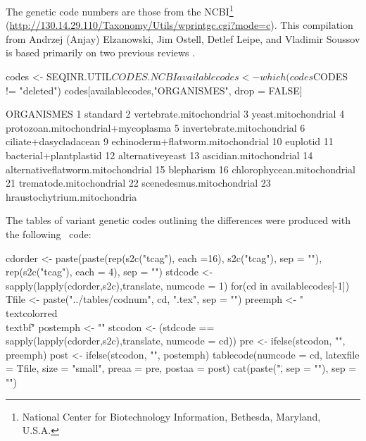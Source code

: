 \documentclass{article}
\begin{document}
The genetic code numbers are those from the NCBI\footnote{
National Center for Biotechnology Information, Bethesda, Maryland, U.S.A.
} (\url{http://130.14.29.110/Taxonomy/Utils/wprintgc.cgi?mode=c}).
This compilation from Andrzej (Anjay) Elzanowski, Jim Ostell, Detlef Leipe, 
and Vladimir Soussov is based primarily on two previous reviews
\cite{OsawaS1992, JukesTH1993}.

\begin{Schunk}
\begin{Sinput}
 codes <- SEQINR.UTIL$CODES.NCBI
 availablecodes <- which(codes$CODES != "deleted")
 codes[availablecodes,"ORGANISMES", drop = FALSE]
\end{Sinput}
\begin{Soutput}
                           ORGANISMES
1                            standard
2            vertebrate.mitochondrial
3                 yeast.mitochondrial
4  protozoan.mitochondrial+mycoplasma
5          invertebrate.mitochondrial
6               ciliate+dasycladacean
9   echinoderm+flatworm.mitochondrial
10                           euplotid
11             bacterial+plantplastid
12                   alternativeyeast
13             ascidian.mitochondrial
14  alternativeflatworm.mitochondrial
15                         blepharism
16        chlorophycean.mitochondrial
21            trematode.mitochondrial
22          scenedesmus.mitochondrial
23       hraustochytrium.mitochondria
\end{Soutput}
\end{Schunk}

The tables of variant genetic codes outlining the differences were produced with the
following \Rlogo{}~code:

\begin{Schunk}
\begin{Sinput}
 cdorder <- paste(paste(rep(s2c("tcag"), each =16), s2c("tcag"), sep = ""), rep(s2c("tcag"), each = 4), sep = "")
 stdcode <- sapply(lapply(cdorder,s2c),translate, numcode = 1)
 for(cd in availablecodes[-1]){
   Tfile <- paste("../tables/codnum", cd, ".tex", sep = "")
   preemph <- "\\textcolor{red}{\\textbf{"
   postemph <- "}}"
   stcodon <- (stdcode ==  sapply(lapply(cdorder,s2c),translate, numcode = cd))
   pre <- ifelse(stcodon, "", preemph)
   post <- ifelse(stcodon, "", postemph)
   tablecode(numcode = cd, latexfile = Tfile, size = "small", preaa = pre, postaa = post)
   cat(paste("\", sep = ""), sep = "\n")
 }
\end{Sinput}















\end{Schunk}
\end{document}

